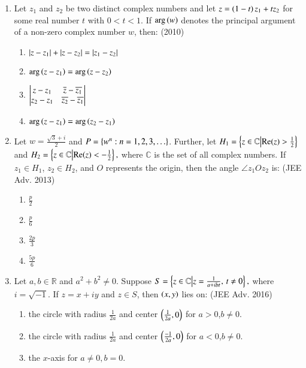 \documentclass[journal]{IEEEtran}
\begin{document}
\begin{enumerate}
\begin{multicols}{4}
\begin{enumerate}
    \end{enumerate}
\end{multicols}
    \item Let $z_1$ and $z_2$ be two distinct complex numbers and let $z= \left(1-t\right)z_1+tz_2$ for some real number $t$ with $0<t<1$. If $\mathrm{arg}\left(w\right)$ denotes the principal argument of a non-zero complex number $w$, then: \hfill (2010)
\begin{enumerate}
    \item $\left\vert z-z_1\right\vert+\left\vert z-z_2\right\vert=\left\vert z_1-z_2\right\vert$
    \item $\mathrm{arg}\left(z-z_1\right)=\mathrm{arg}\left(z-z_2\right)$
    \item $\begin{vmatrix}z-z_1 & \overline{z}-\overline{z_1} \\z_2-z_1 & \overline{z_2}-\overline{z_1}\end{vmatrix}$
    \item $\mathrm{arg}\left(z-z_1\right)=\mathrm{arg}\left(z_2-z_1\right)$
\end{enumerate}
\item Let $w=\frac{\sqrt{3}+i}{2}$ and $P=\left\{w^n:n=1,2,3,\ldots\right\}$. Further, let $H_1=\left\{z \in \mathbb{C} \middle|\text{Re}(z) > \frac{1}{2}\right\}$ and $H_2=\left\{ z \in \mathbb{C}\middle|\text{Re}(z) < -\frac{1}{2}\right\},$
where $\mathbb{C}$ is the set of all complex numbers. If $z_1 \in H_1$, $z_2 \in H_2$, and $O$ represents the origin, then the angle $\angle z_1Oz_2$ is: \hfill (JEE Adv. 2013)
\begin{multicols}{4}
    \begin{enumerate}
    \item $\frac{p}{2}$
    \item $\frac{p}{6}$
    \item $\frac{2p}{3}$
    \item $\frac{5p}{6}$
    \end{enumerate}
\end{multicols}
\item Let $a,b \in \mathbb{R}$ and $a^2+b^2 \ne 0$. Suppose $S=\left\{ z \in \mathbb{C}\middle|z = \frac{1}{a + ibt}, \, t \ne 0\right\},$
    where $i=\sqrt{-1}$. If $z=x+iy$ and $z \in S$, then $\left(x,y\right)$ lies on: \hfill (JEE Adv. 2016)
    \begin{enumerate}
    \item the circle with radius $\frac{1}{2a}$ and center $\left(\frac{1}{2a},0\right)$ for $a>0$,$b \ne 0$.
    \item the circle with radius $\frac{1}{2a}$ and center $\left(\frac{-1}{2a}, 0\right)$ for $a<0$,$b \ne 0$.
    \item the $x$-axis for $a \ne 0 ,b=0$.

\end{enumerate}
\end{enumerate}
\end{document}
